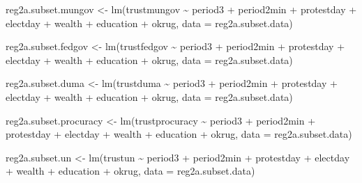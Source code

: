 \documentclass[
  letterpaper,
  DIV=11,
  numbers=noendperiod]{scrartcl}
\newenvironment{Shaded}{\begin{snugshade}}{\end{snugshade}}
\newcommand{\AttributeTok}[1]{\textcolor[rgb]{0.40,0.45,0.13}{#1}}
\newcommand{\FunctionTok}[1]{\textcolor[rgb]{0.28,0.35,0.67}{#1}}
\newcommand{\NormalTok}[1]{\textcolor[rgb]{0.00,0.23,0.31}{#1}}
\newcommand{\OtherTok}[1]{\textcolor[rgb]{0.00,0.23,0.31}{#1}}
\newcommand{\SpecialCharTok}[1]{\textcolor[rgb]{0.37,0.37,0.37}{#1}}
\begin{document}
\begin{Shaded}
\begin{Highlighting}[]
\NormalTok{reg2a.subset.mungov }\OtherTok{\textless{}{-}} \FunctionTok{lm}\NormalTok{(trustmungov }\SpecialCharTok{\textasciitilde{}}\NormalTok{ period3 }\SpecialCharTok{+}\NormalTok{ period2min }\SpecialCharTok{+}\NormalTok{ protestday }\SpecialCharTok{+}\NormalTok{ electday }\SpecialCharTok{+}
\NormalTok{    wealth }\SpecialCharTok{+}\NormalTok{ education }\SpecialCharTok{+}\NormalTok{ okrug, }\AttributeTok{data =}\NormalTok{ reg2a.subset.data)}

\NormalTok{reg2a.subset.fedgov }\OtherTok{\textless{}{-}} \FunctionTok{lm}\NormalTok{(trustfedgov }\SpecialCharTok{\textasciitilde{}}\NormalTok{ period3 }\SpecialCharTok{+}\NormalTok{ period2min }\SpecialCharTok{+}\NormalTok{ protestday }\SpecialCharTok{+}\NormalTok{ electday }\SpecialCharTok{+}
\NormalTok{    wealth }\SpecialCharTok{+}\NormalTok{ education }\SpecialCharTok{+}\NormalTok{ okrug, }\AttributeTok{data =}\NormalTok{ reg2a.subset.data)}

\NormalTok{reg2a.subset.duma }\OtherTok{\textless{}{-}} \FunctionTok{lm}\NormalTok{(trustduma }\SpecialCharTok{\textasciitilde{}}\NormalTok{ period3 }\SpecialCharTok{+}\NormalTok{ period2min }\SpecialCharTok{+}\NormalTok{ protestday }\SpecialCharTok{+}\NormalTok{ electday }\SpecialCharTok{+}
\NormalTok{    wealth }\SpecialCharTok{+}\NormalTok{ education }\SpecialCharTok{+}\NormalTok{ okrug, }\AttributeTok{data =}\NormalTok{ reg2a.subset.data)}

\NormalTok{reg2a.subset.procuracy }\OtherTok{\textless{}{-}} \FunctionTok{lm}\NormalTok{(trustprocuracy }\SpecialCharTok{\textasciitilde{}}\NormalTok{ period3 }\SpecialCharTok{+}\NormalTok{ period2min }\SpecialCharTok{+}\NormalTok{ protestday }\SpecialCharTok{+}\NormalTok{ electday }\SpecialCharTok{+}
\NormalTok{    wealth }\SpecialCharTok{+}\NormalTok{ education }\SpecialCharTok{+}\NormalTok{ okrug, }\AttributeTok{data =}\NormalTok{ reg2a.subset.data)}

\NormalTok{reg2a.subset.un }\OtherTok{\textless{}{-}} \FunctionTok{lm}\NormalTok{(trustun }\SpecialCharTok{\textasciitilde{}}\NormalTok{ period3 }\SpecialCharTok{+}\NormalTok{ period2min }\SpecialCharTok{+}\NormalTok{ protestday }\SpecialCharTok{+}\NormalTok{ electday }\SpecialCharTok{+}
\NormalTok{    wealth }\SpecialCharTok{+}\NormalTok{ education }\SpecialCharTok{+}\NormalTok{ okrug, }\AttributeTok{data =}\NormalTok{ reg2a.subset.data)}


\end{Highlighting}
\end{Shaded}
\end{document}
